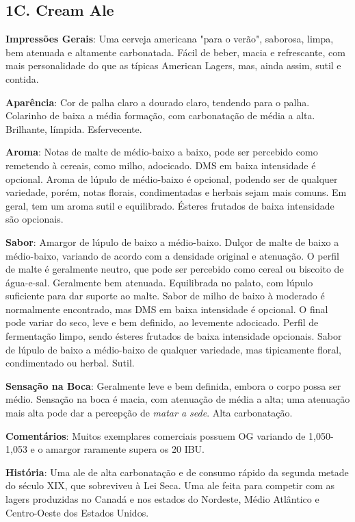 \subsection*{1C. Cream Ale}

\textbf{Impressões Gerais}: Uma cerveja americana "para o verão", saborosa, limpa, bem atenuada e altamente carbonatada. Fácil de beber, macia e refrescante, com mais personalidade do que as típicas American Lagers, mas, ainda assim, sutil e contida.

\textbf{Aparência}: Cor de palha claro a dourado claro, tendendo para o palha. Colarinho de baixa a média formação, com carbonatação de média a alta. Brilhante, límpida. Esfervecente.

\textbf{Aroma}: Notas de malte de médio-baixo a baixo, pode ser percebido como remetendo à cereais, como milho, adocicado. DMS em baixa intensidade é opcional. Aroma de lúpulo de médio-baixo é opcional, podendo ser de qualquer variedade, porém, notas florais, condimentadas e herbais sejam mais comuns. Em geral, tem um aroma sutil e equilibrado. Ésteres frutados de baixa intensidade são opcionais.

\textbf{Sabor}: Amargor de lúpulo de baixo a médio-baixo. Dulçor de malte de baixo a médio-baixo, variando de acordo com a densidade original e atenuação. O perfil de malte é geralmente neutro, que pode ser percebido como cereal ou biscoito de água-e-sal. Geralmente bem atenuada. Equilibrada no palato, com lúpulo suficiente para dar suporte ao malte. Sabor de milho de baixo à moderado é normalmente encontrado, mas DMS em baixa intensidade é opcional. O final pode variar do seco, leve e bem definido, ao levemente adocicado. Perfil de fermentação limpo, sendo ésteres frutados de baixa intensidade opcionais. Sabor de lúpulo de baixo a médio-baixo de qualquer variedade, mas tipicamente floral, condimentado ou herbal. Sutil.

\textbf{Sensação na Boca}: Geralmente leve e bem definida, embora o corpo possa ser médio. Sensação na boca é macia, com atenuação de média a alta; uma atenuação mais alta pode dar a percepção de \textit{matar a sede}. Alta carbonatação.

\textbf{Comentários}: Muitos exemplares comerciais possuem OG variando de 1,050-1,053 e o amargor raramente supera os 20 IBU.

\textbf{História}: Uma ale de alta carbonatação e de consumo rápido da segunda metade do século XIX, que sobreviveu à Lei Seca. Uma ale feita para competir com as lagers produzidas no Canadá e nos estados do Nordeste, Médio Atlântico e Centro-Oeste dos Estados Unidos.

